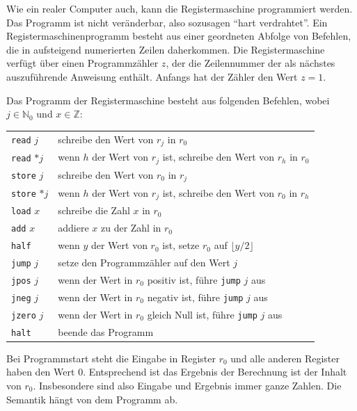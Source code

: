 \documentclass[10pt,reqno]{amsart}
\numberwithin{equation}{section}
\newcommand\NN{\mathbb N}
\newcommand\ZZ{\mathbb Z}
\begin{document}
Wie ein realer Computer auch, kann die Registermaschine programmiert werden.
Das Programm ist nicht ver\"anderbar, also sozusagen ``hart verdrahtet''.
Ein Registermaschinenprogramm besteht aus einer geordneten Abfolge von Befehlen, die in aufsteigend numerierten Zeilen daherkommen.
Die Registermaschine verf\"ugt \"uber einen Programmz\"ahler $z$, der die Zeilennummer der als n\"achstes auszuf\"uhrende Anweisung enth\"alt.
Anfangs hat der Z\"ahler den Wert $z=1$.

Das Programm der Registermaschine besteht aus folgenden Befehlen, wobei $j\in\NN_0$ und $x\in\ZZ$:

\begin{center}
\begin{tabular}{|l|l|}\hline
	{\tt read} $j$&schreibe den Wert von $r_j$ in $r_0$\\
	{\tt read} $*j$&wenn $h$ der Wert von $r_j$ ist, schreibe den Wert von $r_h$ in $r_0$\\
	{\tt store} $j$&schreibe den Wert von $r_0$ in $r_j$\\
	{\tt store} $*j$&wenn $h$ der Wert von $r_j$ ist, schreibe den Wert von $r_0$ in $r_h$\\
	{\tt load} $x$&schreibe die Zahl $x$ in $r_0$\\
	{\tt add} $x$&addiere $x$ zu der Zahl in $r_0$\\
	{\tt half}&wenn $y$ der Wert von $r_0$ ist, setze $r_0$ auf $\lfloor y/2\rfloor$\\
	{\tt jump} $j$&setze den Programmz\"ahler auf den Wert $j$\\
	{\tt jpos} $j$&wenn der Wert in $r_0$ positiv ist, f\"uhre {\tt jump} $j$ aus\\
	{\tt jneg} $j$&wenn der Wert in $r_0$ negativ ist, f\"uhre {\tt jump} $j$ aus\\
	{\tt jzero} $j$&wenn der Wert in $r_0$ gleich Null ist, f\"uhre {\tt jump} $j$ aus\\
	{\tt halt}&beende das Programm\\\hline
\end{tabular}
\end{center}

Bei Programmstart steht die Eingabe in Register $r_0$ und alle anderen Register haben den Wert $0$.
Entsprechend ist das Ergebnis der Berechnung ist der Inhalt von $r_0$.
Insbesondere sind also Eingabe und Ergebnis immer ganze Zahlen.
Die Semantik h\"angt von dem Programm ab.
\end{document}
